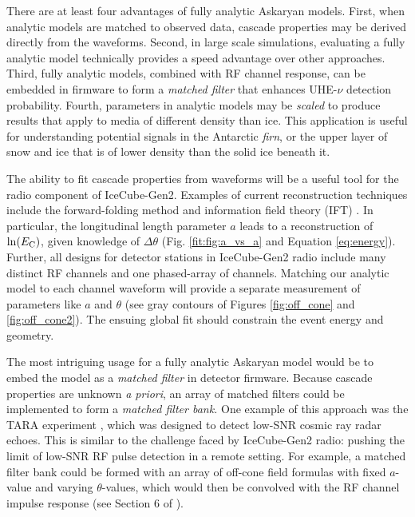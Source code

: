 \documentclass[amsmath,amssymb,aps,prd,10pt,twocolumn]{revtex4}
\begin{document}
There are at least four advantages of fully analytic Askaryan models.  First, when analytic models are matched to observed data, cascade properties may be derived directly from the waveforms.  Second, in large scale simulations, evaluating a fully analytic model technically provides a speed advantage over other approaches.  Third, fully analytic models, combined with RF channel response, can be embedded in firmware to form a \textit{matched filter} that enhances UHE-$\nu$ detection probability.  Fourth, parameters in analytic models may be \textit{scaled} to produce results that apply to media of different density than ice.  This application is useful for understanding potential signals in the Antarctic \textit{firn}, or the upper layer of snow and ice that is of lower density than the solid ice beneath it.

The ability to fit cascade properties from waveforms will be a useful tool for the radio component of IceCube-Gen2.  Examples of current reconstruction techniques include the forward-folding method \cite{10.1088/1748-0221/15/09/p09039} and information field theory (IFT) \cite{IFT}.  In particular, the longitudinal length parameter $a$ leads to a reconstruction of $\ln(E_{\rm C})$, given knowledge of $\Delta \theta$ (Fig. \ref{fit:fig:a_vs_a} and Equation \ref{eq:energy}).  Further, all designs for detector stations in IceCube-Gen2 radio include many distinct RF channels and one phased-array of channels.  Matching our analytic model to each channel waveform will provide a separate measurement of parameters like $a$ and $\theta$ (see gray contours of Figures \ref{fig:off_cone} and \ref{fig:off_cone2}).  The ensuing global fit should constrain the event energy and geometry.

The most intriguing usage for a fully analytic Askaryan model would be to embed the model as a \textit{matched filter} in detector firmware.  Because cascade properties are unknown \textit{a priori}, an array of matched filters could be implemented to form a \textit{matched filter bank.}  One example of this approach was the TARA experiment \cite{ABBASI20171}, which was designed to detect low-SNR cosmic ray radar echoes.  This is similar to the challenge faced by IceCube-Gen2 radio: pushing the limit of low-SNR RF pulse detection in a remote setting.  For example, a matched filter bank could be formed with an array of off-cone field formulas with fixed $a$-value and varying $\theta$-values, which would then be convolved with the RF channel impulse response (see Section 6 of \cite{10.1016/j.astropartphys.2014.09.002}).
\end{document}
